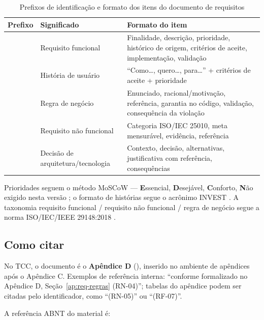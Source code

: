 \begin{table}[H]
\centering
\setlength{\tabcolsep}{3pt}
\caption{Prefixos de identificação e formato dos itens do documento de requisitos}
\label{tab:req-convenicoes}
\begin{tabularx}{\textwidth}{|L{2.2cm}|L{3.4cm}|Y|}
\hline
\textbf{Prefixo} & \textbf{Significado} & \textbf{Formato do item} \\
\hline
\texttt{} & Requisito funcional & Finalidade, descrição, prioridade, histórico de origem, critérios de aceite, implementação, validação \\
\hline
\texttt{} & História de usuário & ``Como\dots, quero\dots, para\dots'' + critérios de aceite + prioridade \\
\hline
\texttt{} & Regra de negócio & Enunciado, racional/motivação, referência, garantia no código, validação, consequência da violação \\
\hline
\texttt{} & Requisito não funcional & Categoria ISO/IEC 25010, meta mensurável, evidência, referência \\
\hline
\texttt{} & Decisão de arquitetura/tecnologia & Contexto, decisão, alternativas, justificativa com referência, consequências \\
\hline
\end{tabularx}
\end{table}

Prioridades seguem o método MoSCoW --- \textbf{E}ssencial, \textbf{D}esejável, \textbf{C}onforto, \textbf{N}\~ao exigido nesta versão \cite{wiegers_beatty_2013}; o formato de histórias segue o acrônimo INVEST \cite{cohn_2004}. A taxonomia requisito funcional / requisito não funcional / regra de negócio segue a norma ISO/IEC/IEEE 29148:2018 \cite{iso_29148}.

\subsection{Como citar}
\label{ap:req-como-citar}

No TCC, o documento é o \textbf{Apêndice D} (\texttt{}), inserido no ambiente de apêndices após o Apêndice C. Exemplos de referência interna: ``conforme formalizado no Apêndice D, Seção~\ref{ap:req-regras} (RN-04)''; tabelas do apêndice podem ser citadas pelo identificador, como ``(RN-05)'' ou ``(RF-07)''.

A referência ABNT do material é:

